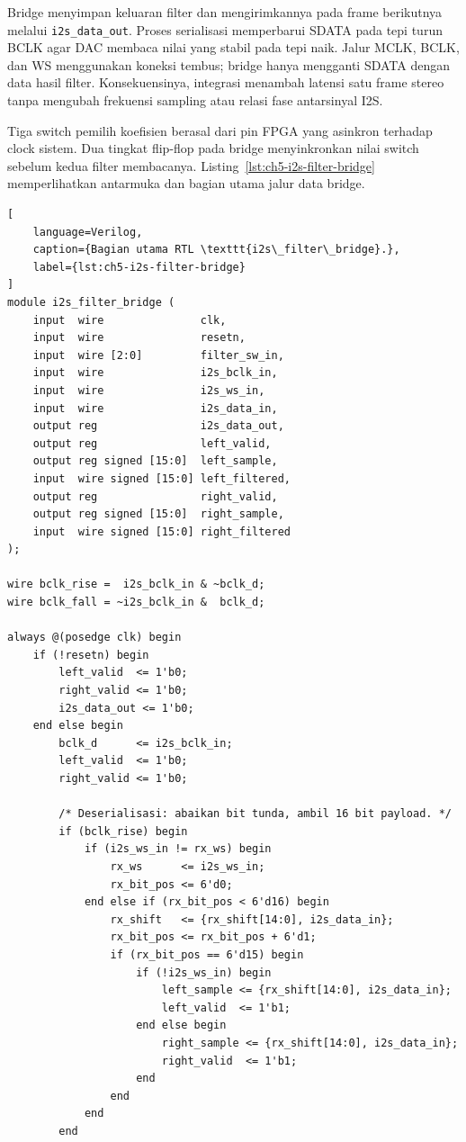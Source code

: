 Bridge menyimpan keluaran filter dan mengirimkannya pada frame berikutnya melalui \texttt{i2s\_data\_out}. Proses serialisasi memperbarui SDATA pada tepi turun BCLK agar DAC membaca nilai yang stabil pada tepi naik. Jalur MCLK, BCLK, dan WS menggunakan koneksi tembus; bridge hanya mengganti SDATA dengan data hasil filter. Konsekuensinya, integrasi menambah latensi satu frame stereo tanpa mengubah frekuensi sampling atau relasi fase antarsinyal I2S.

Tiga switch pemilih koefisien berasal dari pin FPGA yang asinkron terhadap clock sistem. Dua tingkat flip-flop pada bridge menyinkronkan nilai switch sebelum kedua filter membacanya. Listing~\ref{lst:ch5-i2s-filter-bridge} memperlihatkan antarmuka dan bagian utama jalur data bridge.

\begin{lstlisting}[
	language=Verilog,
	caption={Bagian utama RTL \texttt{i2s\_filter\_bridge}.},
	label={lst:ch5-i2s-filter-bridge}
]
module i2s_filter_bridge (
    input  wire               clk,
    input  wire               resetn,
    input  wire [2:0]         filter_sw_in,
    input  wire               i2s_bclk_in,
    input  wire               i2s_ws_in,
    input  wire               i2s_data_in,
    output reg                i2s_data_out,
    output reg                left_valid,
    output reg signed [15:0]  left_sample,
    input  wire signed [15:0] left_filtered,
    output reg                right_valid,
    output reg signed [15:0]  right_sample,
    input  wire signed [15:0] right_filtered
);

wire bclk_rise =  i2s_bclk_in & ~bclk_d;
wire bclk_fall = ~i2s_bclk_in &  bclk_d;

always @(posedge clk) begin
    if (!resetn) begin
        left_valid  <= 1'b0;
        right_valid <= 1'b0;
        i2s_data_out <= 1'b0;
    end else begin
        bclk_d      <= i2s_bclk_in;
        left_valid  <= 1'b0;
        right_valid <= 1'b0;

        /* Deserialisasi: abaikan bit tunda, ambil 16 bit payload. */
        if (bclk_rise) begin
            if (i2s_ws_in != rx_ws) begin
                rx_ws      <= i2s_ws_in;
                rx_bit_pos <= 6'd0;
            end else if (rx_bit_pos < 6'd16) begin
                rx_shift   <= {rx_shift[14:0], i2s_data_in};
                rx_bit_pos <= rx_bit_pos + 6'd1;
                if (rx_bit_pos == 6'd15) begin
                    if (!i2s_ws_in) begin
                        left_sample <= {rx_shift[14:0], i2s_data_in};
                        left_valid  <= 1'b1;
                    end else begin
                        right_sample <= {rx_shift[14:0], i2s_data_in};
                        right_valid  <= 1'b1;
                    end
                end
            end
        end


\end{lstlisting}
